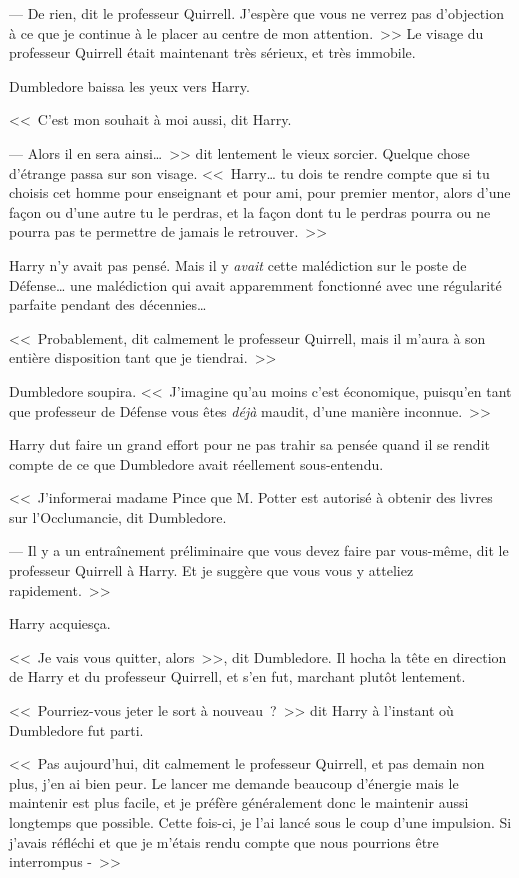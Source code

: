 --- De rien, dit le professeur Quirrell. J'espère que vous ne verrez pas d'objection à ce que je continue à le placer au centre de mon attention.~>> Le visage du professeur Quirrell était maintenant très sérieux, et très immobile.

Dumbledore baissa les yeux vers Harry.

<<~C'est mon souhait à moi aussi, dit Harry.

--- Alors il en sera ainsi…~>> dit lentement le vieux sorcier. Quelque chose d'étrange passa sur son visage. <<~Harry… tu dois te rendre compte que si tu choisis cet homme pour enseignant et pour ami, pour premier mentor, alors d'une façon ou d'une autre tu le perdras, et la façon dont tu le perdras pourra ou ne pourra pas te permettre de jamais le retrouver.~>>

Harry n'y avait pas pensé. Mais il y \emph{avait} cette malédiction sur le poste de Défense… une malédiction qui avait apparemment fonctionné avec une régularité parfaite pendant des décennies…

<<~Probablement, dit calmement le professeur Quirrell, mais il m'aura à son entière disposition tant que je tiendrai.~>>

Dumbledore soupira. <<~J'imagine qu'au moins c'est économique, puisqu'en tant que professeur de Défense vous êtes \emph{déjà} maudit, d'une manière inconnue.~>>

Harry dut faire un grand effort pour ne pas trahir sa pensée quand il se rendit compte de ce que Dumbledore avait réellement sous-entendu.

<<~J'informerai madame Pince que M. Potter est autorisé à obtenir des livres sur l'Occlumancie, dit Dumbledore.

--- Il y a un entraînement préliminaire que vous devez faire par vous-même, dit le professeur Quirrell à Harry. Et je suggère que vous vous y atteliez rapidement.~>>

Harry acquiesça.

<<~Je vais vous quitter, alors~>>, dit Dumbledore. Il hocha la tête en direction de Harry et du professeur Quirrell, et s'en fut, marchant plutôt lentement.

<<~Pourriez-vous jeter le sort à nouveau~?~>> dit Harry à l'instant où Dumbledore fut parti.

<<~Pas aujourd'hui, dit calmement le professeur Quirrell, et pas demain non plus, j'en ai bien peur. Le lancer me demande beaucoup d'énergie mais le maintenir est plus facile, et je préfère généralement donc le maintenir aussi longtemps que possible. Cette fois-ci, je l'ai lancé sous le coup d'une impulsion. Si j'avais réfléchi et que je m'étais rendu compte que nous pourrions être interrompus -~>>

